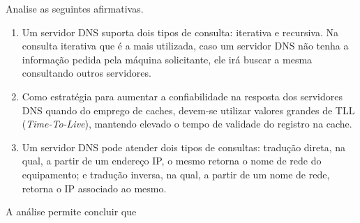 \documentclass[10pt,a4paper]{article}
\begin{document}
%
{
\def\AMCbeginQuestion#1#2{\par\noindent{\bf (POSCOMP 2008 - Questão 07)}}
\begin{question}{} Analise as seguintes afirmativas.
\begin{enumerate}[label=\Roman*.]
\item Um servidor DNS suporta dois tipos de consulta: iterativa e recursiva. Na consulta iterativa que é a mais utilizada, caso um servidor DNS não tenha a informação pedida pela máquina solicitante, ele irá buscar a mesma consultando outros servidores.
\item Como estratégia para aumentar a confiabilidade na resposta dos servidores DNS quando do emprego de caches, devem-se utilizar valores grandes de TLL (\textit{Time-To-Live}), mantendo elevado o tempo de validade do registro na cache.
\item Um servidor DNS pode atender dois tipos de consultas: tradução direta, na qual, a partir de um endereço IP, o mesmo retorna o nome de rede do equipamento; e tradução inversa, na qual, a partir de um nome de rede, retorna o IP associado ao mesmo.
\end{enumerate}
A análise permite concluir que
\begin{choices}
\end{choices}
\end{question}
}
%
\end{document}
